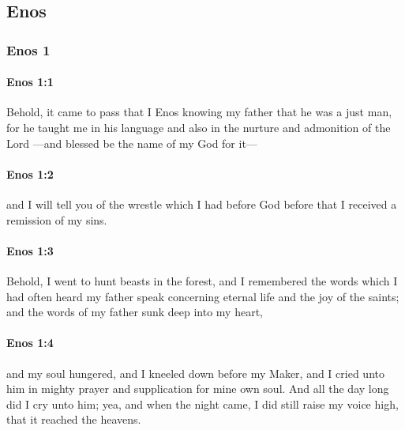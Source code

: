\subsection{Enos}
	\label{ENOS}

	\subsubsection{Enos 1} %
		\label{ENOS-1}
	
		\paragraph{Enos 1:1} %
			\label{ENOS-1-1}

			Behold, it came to pass that
			I Enos knowing my father that he was a just man,
			for he taught me in his language
			and also in the nurture and admonition of the Lord
			---and blessed be the name of my God for it---

		\paragraph{Enos 1:2} %
			\label{ENOS-1-2}

			and I will tell you of the wrestle which I had before God
			before that I received a remission of my sins.

		\paragraph{Enos 1:3} %
			\label{ENOS-1-3}

			Behold, I went to hunt beasts in the forest,
			and I remembered the words which I had often heard my father speak
			concerning eternal life and the joy of the saints;
			and the words of my father sunk deep into my heart,

		\paragraph{Enos 1:4} %
			\label{ENOS-1-4}

			and my soul hungered,
			and I kneeled down before my Maker,
			and I cried unto him in mighty prayer and supplication for mine own soul.
			And all the day long did I cry unto him;
			yea, and when the night came, I did still raise my voice high,
			that it reached the heavens.

